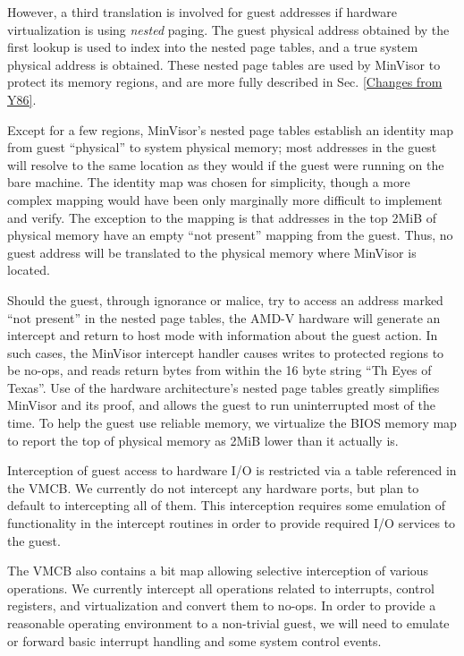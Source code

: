 \documentclass[submission,copyright]{eptcs} \providecommand{\event}{ACL2 2011}
\begin{document}
However, a third translation is involved for guest addresses if
hardware virtualization is using \textit{nested} paging. The guest
physical address obtained by the first lookup is used to index into
the nested page tables, and a true system physical address is
obtained.  These nested page tables are used by MinVisor to protect
its memory regions, and are more fully described in Sec. \ref{Changes
  from Y86}.



Except for a few regions, MinVisor's nested page tables establish an
identity map from guest ``physical'' to system physical memory; most
addresses in the guest will resolve to the same location as they would
if the guest were running on the bare machine.  The identity map was
chosen for simplicity, though a more complex mapping would have been
only marginally more difficult to implement and verify.  The exception
to the mapping is that addresses in the top 2MiB of physical memory
have an empty ``not present'' mapping from the guest.  Thus, no guest
address will be translated to the physical memory where MinVisor is
located.

Should the guest, through ignorance or malice, try to access
an address marked ``not present'' in the nested page tables, the AMD-V
hardware will generate an intercept and return to host mode with
information about the guest action.  In such cases, the MinVisor
intercept handler causes writes to protected regions to be no-ops, and
reads return bytes from within the 16 byte string ``Th Eyes of
Texas''.  Use of the hardware architecture's nested page tables
greatly simplifies MinVisor and its proof, and allows the guest to run
uninterrupted most of the time. To help the guest use reliable memory,
we virtualize the BIOS memory map to report the top of physical memory
as 2MiB lower than it actually is.

Interception of guest access to hardware I/O is restricted via a table
referenced in the VMCB. We currently do not intercept any hardware
ports, but plan to default to intercepting all of them. This
interception requires some emulation of functionality in the intercept
routines in order to provide required I/O services to the guest.

The VMCB also contains a bit map allowing selective interception of
various operations. We currently intercept all operations related to
interrupts, control registers, and virtualization and convert them to
no-ops. In order to provide a reasonable operating environment to a
non-trivial guest, we will need to emulate or forward basic interrupt
handling and some system control events.
\end{document}

